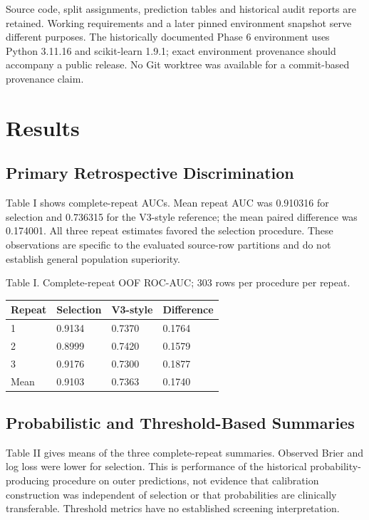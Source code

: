 \documentclass[conference]{IEEEtran}
\begin{document}
Source code, split assignments, prediction tables and historical audit reports are retained. Working requirements and a later pinned environment snapshot serve different purposes. The historically documented Phase 6 environment uses Python 3.11.16 and scikit-learn 1.9.1; exact environment provenance should accompany a public release. No Git worktree was available for a commit-based provenance claim.

\section{Results}
\subsection{Primary Retrospective Discrimination}
Table I shows complete-repeat AUCs. Mean repeat AUC was 0.910316 for selection and 0.736315 for the V3-style reference; the mean paired difference was 0.174001. All three repeat estimates favored the selection procedure. These observations are specific to the evaluated source-row partitions and do not establish general population superiority.

Table I. Complete-repeat OOF ROC-AUC; 303 rows per procedure per repeat.

\begin{center}\footnotesize
\begin{tabular}{p{}p{}p{}p{}}
\hline
Repeat & Selection & V3-style & Difference \\
\hline
1 & 0.9134 & 0.7370 & 0.1764 \\
2 & 0.8999 & 0.7420 & 0.1579 \\
3 & 0.9176 & 0.7300 & 0.1877 \\
Mean & 0.9103 & 0.7363 & 0.1740 \\
\hline
\end{tabular}
\end{center}
\subsection{Probabilistic and Threshold-Based Summaries}
Table II gives means of the three complete-repeat summaries. Observed Brier and log loss were lower for selection. This is performance of the historical probability-producing procedure on outer predictions, not evidence that calibration construction was independent of selection or that probabilities are clinically transferable. Threshold metrics have no established screening interpretation.
\end{document}
